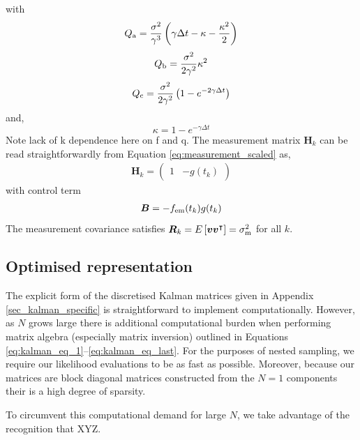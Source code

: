 \documentclass[fleqn,usenatbib,useAMS]{mnras}
\begin{document}
with 
\begin{equation}
	Q_{\rm a} = \frac{\sigma^2}{\gamma^3} \left(\gamma \Delta t - \kappa - \frac{\kappa^2}{2} \right)
\end{equation}
\begin{equation}
	Q_{\rm b} = \frac{\sigma^2}{2 \gamma^2} \kappa^2
\end{equation}
\begin{equation}
	Q_{\rm c} = \frac{\sigma^2}{2 \gamma^2} \left( 1 - e^{-2 \gamma \Delta t}\right)
\end{equation}
and,
\begin{equation}
	\kappa = 1 - e^{-\gamma \Delta t}
\end{equation}
Note lack of k dependence here on f and q. The measurement matrix $\boldsymbol{H}_k$ can be read straightforwardly from Equation \eqref{eq:measurement_scaled} as,
\begin{eqnarray}
	\boldsymbol{H}_k = \begin{pmatrix}
		1 & -g(t_k)
	\end{pmatrix}
\end{eqnarray}
with control term
\begin{eqnarray}
	\boldsymbol{B} = -f_{\rm em}(t_k) g(t_k)
\end{eqnarray}
The measurement covariance satisfies $\boldsymbol{R}_k = E \left[ \boldsymbol{v} \boldsymbol{v}^\intercal \right] = \sigma^2_{\rm m}$ for all $k$.








\subsection{Optimised representation}
The explicit form of the discretised Kalman matrices given in Appendix \ref{sec_kalman_specific} is straightforward to implement computationally. However, as $N$ grows large there is additional computational burden when performing matrix algebra (especially matrix inversion) outlined in Equations \eqref{eq:kalman_eq_1}--\eqref{eq:kalman_eq_last}. For the purposes of nested sampling, we require our likelihood evaluations to be as fast as possible. Moreover, because our matrices are block diagonal matrices constructed from the $N=1$ components their is a high degree of sparsity. 


To circumvent this computational demand for large $N$, we take advantage of the recognition that XYZ.
\end{document}
